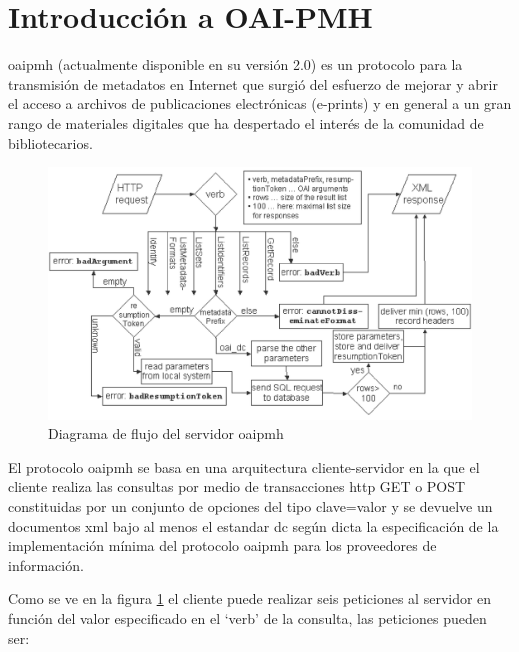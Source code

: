 \section{Introducción a OAI-PMH}

\acrfull{oaipmh} (actualmente disponible en su versión 2.0) es un protocolo para la transmisión de metadatos en Internet que surgió del esfuerzo de mejorar y abrir el acceso a archivos de publicaciones electrónicas (e-prints) y en general a un gran rango de materiales digitales que ha despertado el interés de la comunidad de bibliotecarios.\cite{JM_OAI}

\begin{figure}[!htp]
	\centering
	\includegraphics[scale=.15]{fig/oai_flow}
	\caption{Diagrama de flujo del servidor \acrshort{oaipmh}}\label{fig:oaiflow}
\end{figure}

El protocolo \acrshort{oaipmh} se basa en una arquitectura cliente-servidor en la que el cliente realiza las consultas por medio de transacciones \acrshort{http} GET o POST constituidas por un conjunto de opciones del tipo clave=valor y se devuelve un documentos \acrshort{xml} bajo al menos el estandar \acrfull{dc} según dicta la especificación de la implementación mínima del protocolo \acrshort{oaipmh} para los proveedores de información.\cite{OAIPMH_implementers}

Como se ve en la figura \ref{fig:oaiflow}\cite{oai_implementation} el cliente puede realizar seis peticiones al servidor en función del valor especificado en el `verb' de la consulta, las peticiones pueden ser:

